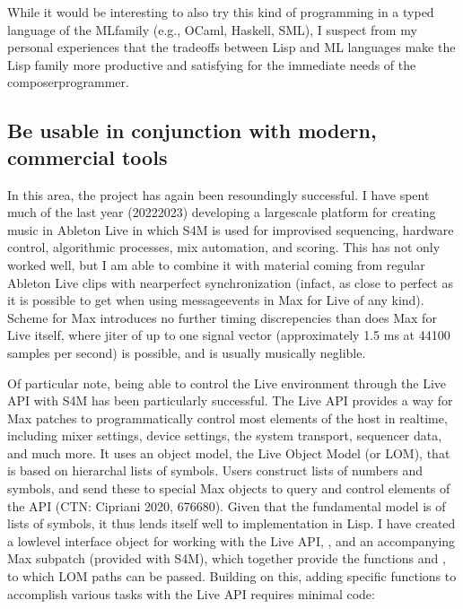 \documentclass[letterpaper,10pt,english]{sphinxmanual}
\begin{document}
\sphinxAtStartPar
While it would be interesting to also try this kind of programming in a typed language
of the ML\sphinxhyphen{}family (e.g., OCaml, Haskell, SML), I suspect from my personal experiences that
the trade\sphinxhyphen{}offs between Lisp and ML languages make the Lisp family more
productive and satisfying for the immediate needs of the composer\sphinxhyphen{}programmer.


\subsection{Be usable in conjunction with modern, commercial tools}
\label{\detokenize{conclusion:be-usable-in-conjunction-with-modern-commercial-tools}}
\sphinxAtStartPar
In this area, the project has again been resoundingly successful.
I have spent much of the last year (2022\sphinxhyphen{}2023) developing a large\sphinxhyphen{}scale platform for creating music
in Ableton Live in which S4M is used for improvised sequencing, hardware control, algorithmic processes,
mix automation, and scoring. This has not only worked well, but I am able to combine
it with material coming from regular Ableton Live clips with near\sphinxhyphen{}perfect synchronization (infact,
as close to perfect as it is possible to get when using message\sphinxhyphen{}events in Max for Live of any kind).
Scheme for Max introduces no further timing discrepencies than does Max for Live itself, where
jiter of up to one signal vector (approximately 1.5 ms at 44100 samples per second) is possible, and is
usually musically neglible.

\sphinxAtStartPar
Of particular note, being able to control the Live environment through the Live API with S4M has
been particularly successful. The Live API provides a way for Max patches to programmatically control
most elements of the host in real\sphinxhyphen{}time, including mixer settings, device settings, the system transport,
sequencer data, and much more. It uses an object model, the Live Object Model (or LOM), that
is based on hierarchal lists of symbols. Users construct lists of numbers and symbols, and send
these to special Max objects to query and control elements of the API (CTN: Cipriani 2020, 676\sphinxhyphen{}680).
Given that the fundamental model is of lists of symbols, it thus lends itself well to implementation in Lisp.
I have created a low\sphinxhyphen{}level interface object for working with the Live API, , and an accompanying
Max subpatch (provided with S4M), which together provide the functions
 and , to which LOM paths can be passed.
Building on this, adding specific functions to accomplish various tasks with the Live API
requires minimal code:
\end{document}

